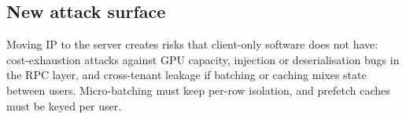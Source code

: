 \subsection{New attack surface}
Moving IP to the server creates risks that client-only software does not have:
cost-exhaustion attacks against GPU capacity, injection or deserialisation bugs in the RPC
layer, and cross-tenant leakage if batching or caching mixes state between users.
Micro-batching must keep per-row isolation, and prefetch caches must be keyed per user.
